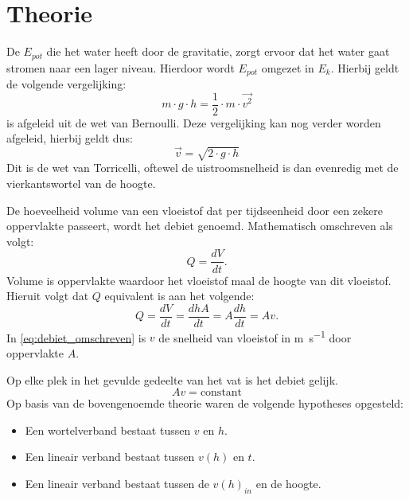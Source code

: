 \documentclass[numbers=endperiod]{scrartcl}
\begin{document}
\newpage
\section{Theorie}

De $E_{pot}$ die het water heeft door de gravitatie, zorgt ervoor dat het water gaat stromen naar een lager niveau. Hierdoor wordt $E_{pot}$ omgezet in $E_{k}$. Hierbij geldt de volgende vergelijking:
\begin{equation}\label{eq:som}
m \cdot g \cdot h = \frac{1}{2} \cdot m \cdot \vec{v^2}
\end{equation}
 is afgeleid uit de wet van Bernoulli. Deze vergelijking kan nog verder worden afgeleid, hierbij geldt dus:
\begin{equation}\label{torricelli}
\vec{v} = \sqrt{2 \cdot g \cdot h}
\end{equation}
Dit is de wet van Torricelli, oftewel de uistroomsnelheid is dan evenredig met de vierkantswortel van de hoogte.

\vspace{5mm}
De hoeveelheid volume van een vloeistof dat per tijdseenheid door een zekere oppervlakte passeert, wordt het debiet genoemd. Mathematisch omschreven als volgt:
\begin{equation}\label{eq:debiet}
    Q = \frac{dV}{dt}.
\end{equation}
Volume is oppervlakte waardoor het vloeistof maal de hoogte van dit vloeistof. Hieruit volgt dat $Q$ equivalent is aan het volgende:
\begin{equation}\label{eq:debiet_omschreven}
    Q = \frac{dV}{dt} = \frac{dhA}{dt} = A\frac{dh}{dt} = Av.
\end{equation}
In \cref{eq:debiet_omschreven} is $v$ de snelheid van vloeistof in \si{\meter\per\second} door oppervlakte $A$.

Op elke plek in het gevulde gedeelte van het vat is het debiet gelijk. 
\begin{equation}\label{eq:constant_debiet}
    Av = \text{constant}
\end{equation}
Op basis van de bovengenoemde theorie waren de volgende hypotheses opgesteld:
\begin{itemize}
 \renewcommand{\labelitemi}{\scriptsize$\blacksquare$}
    \item Een wortelverband bestaat tussen $v$ en $h$.
    \item Een lineair verband bestaat tussen $v(h)$ en $t$.
    \item Een lineair verband bestaat tussen de $v(h)_{in}$ en de hoogte. 
\end{itemize}
\end{document}
